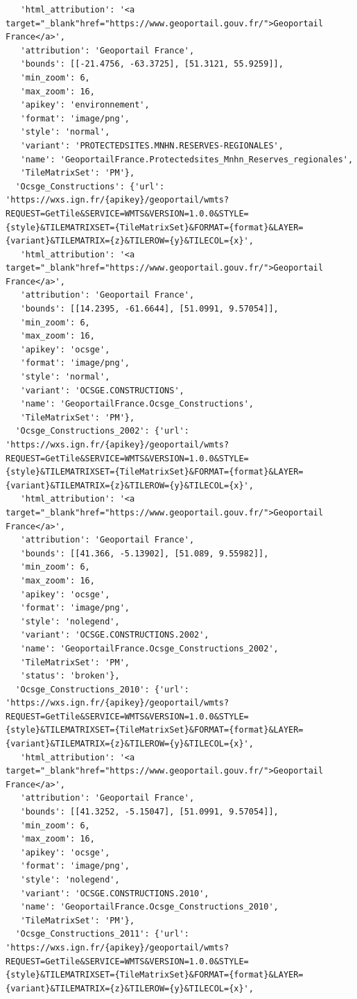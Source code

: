 \documentclass[
  letterpaper,
  DIV=11,
  numbers=noendperiod]{scrreprt}
\begin{document}
\begin{verbatim}
   'html_attribution': '<a target="_blank"href="https://www.geoportail.gouv.fr/">Geoportail France</a>',
   'attribution': 'Geoportail France',
   'bounds': [[-21.4756, -63.3725], [51.3121, 55.9259]],
   'min_zoom': 6,
   'max_zoom': 16,
   'apikey': 'environnement',
   'format': 'image/png',
   'style': 'normal',
   'variant': 'PROTECTEDSITES.MNHN.RESERVES-REGIONALES',
   'name': 'GeoportailFrance.Protectedsites_Mnhn_Reserves_regionales',
   'TileMatrixSet': 'PM'},
  'Ocsge_Constructions': {'url': 'https://wxs.ign.fr/{apikey}/geoportail/wmts?REQUEST=GetTile&SERVICE=WMTS&VERSION=1.0.0&STYLE={style}&TILEMATRIXSET={TileMatrixSet}&FORMAT={format}&LAYER={variant}&TILEMATRIX={z}&TILEROW={y}&TILECOL={x}',
   'html_attribution': '<a target="_blank"href="https://www.geoportail.gouv.fr/">Geoportail France</a>',
   'attribution': 'Geoportail France',
   'bounds': [[14.2395, -61.6644], [51.0991, 9.57054]],
   'min_zoom': 6,
   'max_zoom': 16,
   'apikey': 'ocsge',
   'format': 'image/png',
   'style': 'normal',
   'variant': 'OCSGE.CONSTRUCTIONS',
   'name': 'GeoportailFrance.Ocsge_Constructions',
   'TileMatrixSet': 'PM'},
  'Ocsge_Constructions_2002': {'url': 'https://wxs.ign.fr/{apikey}/geoportail/wmts?REQUEST=GetTile&SERVICE=WMTS&VERSION=1.0.0&STYLE={style}&TILEMATRIXSET={TileMatrixSet}&FORMAT={format}&LAYER={variant}&TILEMATRIX={z}&TILEROW={y}&TILECOL={x}',
   'html_attribution': '<a target="_blank"href="https://www.geoportail.gouv.fr/">Geoportail France</a>',
   'attribution': 'Geoportail France',
   'bounds': [[41.366, -5.13902], [51.089, 9.55982]],
   'min_zoom': 6,
   'max_zoom': 16,
   'apikey': 'ocsge',
   'format': 'image/png',
   'style': 'nolegend',
   'variant': 'OCSGE.CONSTRUCTIONS.2002',
   'name': 'GeoportailFrance.Ocsge_Constructions_2002',
   'TileMatrixSet': 'PM',
   'status': 'broken'},
  'Ocsge_Constructions_2010': {'url': 'https://wxs.ign.fr/{apikey}/geoportail/wmts?REQUEST=GetTile&SERVICE=WMTS&VERSION=1.0.0&STYLE={style}&TILEMATRIXSET={TileMatrixSet}&FORMAT={format}&LAYER={variant}&TILEMATRIX={z}&TILEROW={y}&TILECOL={x}',
   'html_attribution': '<a target="_blank"href="https://www.geoportail.gouv.fr/">Geoportail France</a>',
   'attribution': 'Geoportail France',
   'bounds': [[41.3252, -5.15047], [51.0991, 9.57054]],
   'min_zoom': 6,
   'max_zoom': 16,
   'apikey': 'ocsge',
   'format': 'image/png',
   'style': 'nolegend',
   'variant': 'OCSGE.CONSTRUCTIONS.2010',
   'name': 'GeoportailFrance.Ocsge_Constructions_2010',
   'TileMatrixSet': 'PM'},
  'Ocsge_Constructions_2011': {'url': 'https://wxs.ign.fr/{apikey}/geoportail/wmts?REQUEST=GetTile&SERVICE=WMTS&VERSION=1.0.0&STYLE={style}&TILEMATRIXSET={TileMatrixSet}&FORMAT={format}&LAYER={variant}&TILEMATRIX={z}&TILEROW={y}&TILECOL={x}',

\end{verbatim}
\end{document}
